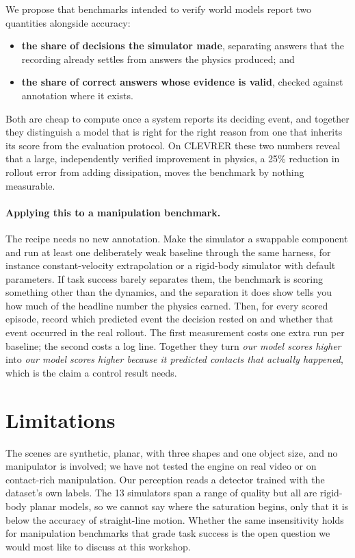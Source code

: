 \documentclass[10pt,letterpaper]{article}
\begin{document}
We propose that benchmarks intended to verify world models report two quantities alongside
accuracy:

\vspace{-0.8ex}
\begin{itemize}\itemsep1pt \parskip0pt
\item \textbf{the share of decisions the simulator made}, separating answers that the
recording already settles from answers the physics produced; and
\item \textbf{the share of correct answers whose evidence is valid}, checked against
annotation where it exists.
\end{itemize}
\vspace{-0.8ex}

Both are cheap to compute once a system reports its deciding event, and together they
distinguish a model that is right for the right reason from one that inherits its score from
the evaluation protocol. On CLEVRER these two numbers reveal that a large, independently
verified improvement in physics, a 25\% reduction in rollout error from adding dissipation,
moves the benchmark by nothing measurable.

\paragraph{Applying this to a manipulation benchmark.} The recipe needs no new annotation.
Make the simulator a swappable component and run at least one deliberately weak baseline
through the same harness, for instance constant-velocity extrapolation or a rigid-body
simulator with default parameters. If task success barely separates them, the benchmark is
scoring something other than the dynamics, and the separation it does show tells you how much
of the headline number the physics earned. Then, for every scored episode, record which
predicted event the decision rested on and whether that event occurred in the real rollout.
The first measurement costs one extra run per baseline; the second costs a log line. Together
they turn \emph{our model scores higher} into \emph{our model scores higher because it
predicted contacts that actually happened}, which is the claim a control result needs.

\vspace{-0.5ex}
\section{Limitations}
\vspace{-0.5ex}

The scenes are synthetic, planar, with three shapes and one object size, and no manipulator
is involved; we have not tested the engine on real video or on contact-rich manipulation. Our
perception reads a detector trained with the dataset's own labels. The 13 simulators span a
range of quality but all are rigid-body planar models, so we cannot say where the saturation
begins, only that it is below the accuracy of straight-line motion. Whether the same
insensitivity holds for manipulation benchmarks that grade task success is the open question
we would most like to discuss at this workshop.

{\small


}
\end{document}
